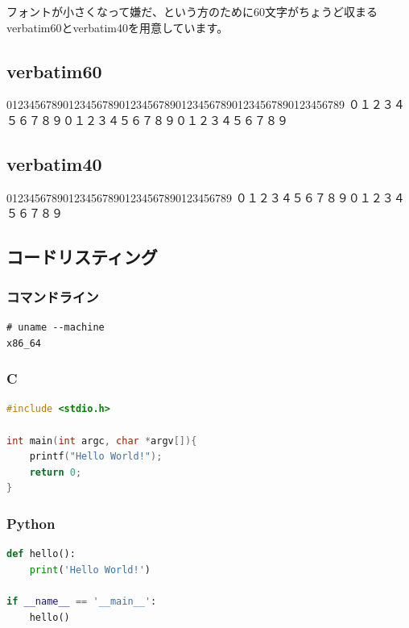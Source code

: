 フォントが小さくなって嫌だ、という方のために60文字がちょうど収まるverbatim60とverbatim40を用意しています。

\subsection{verbatim60}

\begin{verbatim60}
012345678901234567890123456789012345678901234567890123456789
０１２３４５６７８９０１２３４５６７８９０１２３４５６７８９
\end{verbatim60}

\subsection{verbatim40}

\begin{verbatim40}
0123456789012345678901234567890123456789
０１２３４５６７８９０１２３４５６７８９
\end{verbatim40}

\subsection{コードリスティング}

\subsubsection{コマンドライン}
\begin{lstlisting}[language=command]
# uname --machine
x86_64
\end{lstlisting}

\subsubsection{C}
\begin{lstlisting}[language=C]
#include <stdio.h>

int main(int argc, char *argv[]){
    printf("Hello World!");
    return 0;
}
\end{lstlisting}

\subsubsection{Python}
\begin{lstlisting}[language=python]
def hello():
    print('Hello World!')

if __name__ == '__main__':
    hello()
\end{lstlisting}

